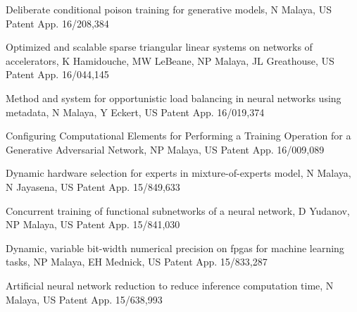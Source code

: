 Deliberate conditional poison training for generative models, N Malaya, US Patent App. 16/208,384

\blankline

Optimized and scalable sparse triangular linear systems on networks of accelerators, K Hamidouche, MW LeBeane, NP Malaya, JL Greathouse, US Patent App. 16/044,145

\blankline

Method and system for opportunistic load balancing in neural networks using metadata, N Malaya, Y Eckert, US Patent App. 16/019,374

\blankline

Configuring Computational Elements for Performing a Training Operation for a Generative Adversarial Network, NP Malaya, US Patent App. 16/009,089

\blankline

Dynamic hardware selection for experts in mixture-of-experts model, N Malaya, N Jayasena, US Patent App. 15/849,633

\blankline

Concurrent training of functional subnetworks of a neural network, D Yudanov, NP Malaya, US Patent App. 15/841,030

\blankline

Dynamic, variable bit-width numerical precision on fpgas for machine learning tasks, NP Malaya, EH Mednick, US Patent App. 15/833,287

\blankline

Artificial neural network reduction to reduce inference computation time, N Malaya, US Patent App. 15/638,993